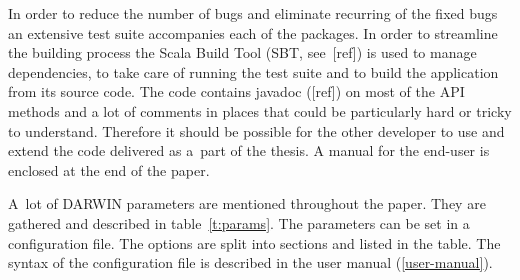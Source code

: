 In order to reduce the number of bugs and eliminate recurring of the fixed
bugs an extensive test suite accompanies each of the packages. In order to
streamline the building process the Scala Build Tool (SBT, see~[ref]) is used
to manage dependencies, to take care of running the test suite and to build
the application from its source code. The code contains javadoc ([ref]) on
most of the API methods and a lot of comments in places that could be
particularly hard or tricky to understand. Therefore it should be possible for
the other developer to use and extend the code delivered as a~part of the
thesis. A manual for the end-user is enclosed at the end of the paper.

A~lot of DARWIN parameters are mentioned throughout the paper. They are
gathered and described in table~\ref{t:params}. The parameters can be set in a
configuration file. The options are split into sections and listed in the
table. The syntax of the configuration file is described in the user manual
(\ref{user-manual}).

